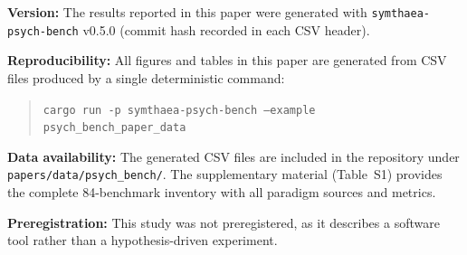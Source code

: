\documentclass[11pt,letterpaper]{article}
\begin{document}
\noindent\textbf{Version:} The results reported in this paper were generated with \texttt{symthaea-psych-bench} v0.5.0 (commit hash recorded in each CSV header).

\noindent\textbf{Reproducibility:} All figures and tables in this paper are generated from CSV files produced by a single deterministic command:
\begin{quote}
\texttt{cargo run -p symthaea-psych-bench --example psych\_bench\_paper\_data}
\end{quote}

\noindent\textbf{Data availability:} The generated CSV files are included in the repository under \texttt{papers/\allowbreak{}data/\allowbreak{}psych\_bench/}. The supplementary material (Table~S1) provides the complete 84-benchmark inventory with all paradigm sources and metrics.

\noindent\textbf{Preregistration:} This study was not preregistered, as it describes a software tool rather than a hypothesis-driven experiment.



\end{document}
